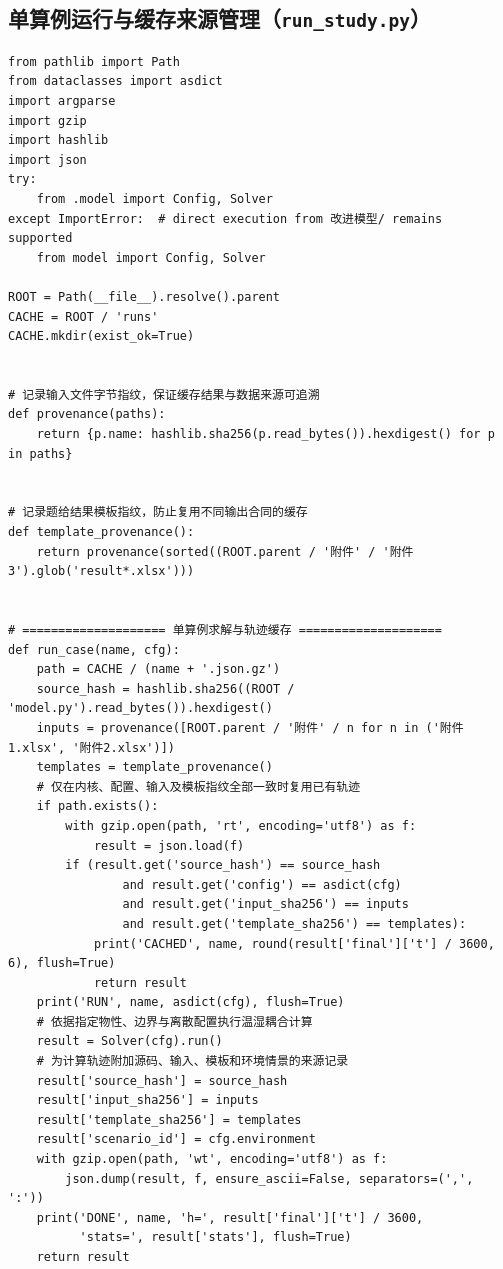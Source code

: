 \subsection{单算例运行与缓存来源管理（\texttt{run\_study.py}）}
\begin{Verbatim}[fontsize=\scriptsize,breaklines=true,breakanywhere=true]
from pathlib import Path
from dataclasses import asdict
import argparse
import gzip
import hashlib
import json
try:
    from .model import Config, Solver
except ImportError:  # direct execution from 改进模型/ remains supported
    from model import Config, Solver

ROOT = Path(__file__).resolve().parent
CACHE = ROOT / 'runs'
CACHE.mkdir(exist_ok=True)


# 记录输入文件字节指纹，保证缓存结果与数据来源可追溯
def provenance(paths):
    return {p.name: hashlib.sha256(p.read_bytes()).hexdigest() for p in paths}


# 记录题给结果模板指纹，防止复用不同输出合同的缓存
def template_provenance():
    return provenance(sorted((ROOT.parent / '附件' / '附件3').glob('result*.xlsx')))


# ==================== 单算例求解与轨迹缓存 ====================
def run_case(name, cfg):
    path = CACHE / (name + '.json.gz')
    source_hash = hashlib.sha256((ROOT / 'model.py').read_bytes()).hexdigest()
    inputs = provenance([ROOT.parent / '附件' / n for n in ('附件1.xlsx', '附件2.xlsx')])
    templates = template_provenance()
    # 仅在内核、配置、输入及模板指纹全部一致时复用已有轨迹
    if path.exists():
        with gzip.open(path, 'rt', encoding='utf8') as f:
            result = json.load(f)
        if (result.get('source_hash') == source_hash
                and result.get('config') == asdict(cfg)
                and result.get('input_sha256') == inputs
                and result.get('template_sha256') == templates):
            print('CACHED', name, round(result['final']['t'] / 3600, 6), flush=True)
            return result
    print('RUN', name, asdict(cfg), flush=True)
    # 依据指定物性、边界与离散配置执行温湿耦合计算
    result = Solver(cfg).run()
    # 为计算轨迹附加源码、输入、模板和环境情景的来源记录
    result['source_hash'] = source_hash
    result['input_sha256'] = inputs
    result['template_sha256'] = templates
    result['scenario_id'] = cfg.environment
    with gzip.open(path, 'wt', encoding='utf8') as f:
        json.dump(result, f, ensure_ascii=False, separators=(',', ':'))
    print('DONE', name, 'h=', result['final']['t'] / 3600,
          'stats=', result['stats'], flush=True)
    return result



\end{Verbatim}
